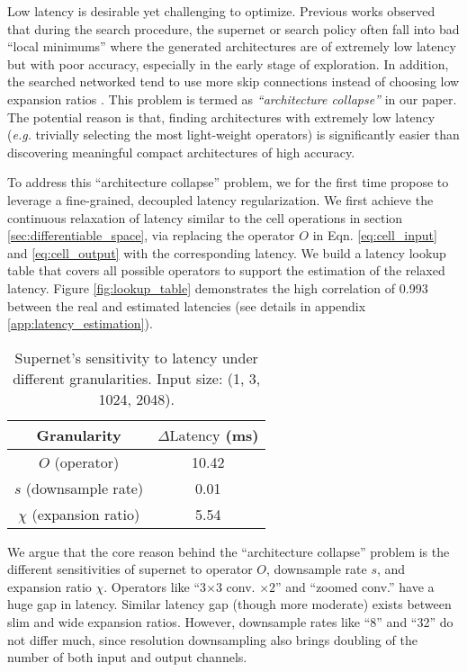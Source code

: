 \documentclass{article} \usepackage{iclr2020_conference,times}
\begin{document}
Low latency is desirable yet challenging to optimize. Previous works \citep{cheng2018instanas,zhang2019customizable} observed that during the search procedure, the supernet or search policy often fall into bad ``local minimums'' where the generated architectures are of extremely low latency but with poor accuracy, especially in the early stage of exploration. In addition, the searched networked tend to use more skip connections instead of choosing low expansion ratios \citep{shaw2019squeezenas}. This problem is termed as \textit{``architecture collapse''} in our paper. The potential reason is that, finding architectures with extremely low latency (\textit{e.g.} trivially selecting the most light-weight operators) is significantly easier than discovering meaningful compact architectures of high accuracy.

To address this ``architecture collapse'' problem, we for the first time propose to leverage a fine-grained, decoupled latency regularization. We first achieve the continuous relaxation of latency similar to the cell operations in section \ref{sec:differentiable_space}, via replacing the operator $O$ in Eqn. \ref{eq:cell_input} and \ref{eq:cell_output} with the corresponding latency. We build a latency lookup table that covers all possible operators to support the estimation of the relaxed latency. Figure \ref{fig:lookup_table} demonstrates the high correlation of 0.993 between the real and estimated latencies (see details in appendix \ref{app:latency_estimation}).

\begin{wraptable}{r}{56mm}
\vspace{-1.2em}
\footnotesize
\begin{center}
\caption{Supernet's sensitivity to latency under different granularities. Input size: (1, 3, 1024, 2048).}
\begin{tabular}{cc}\toprule
Granularity & $\Delta \mathrm{Latency}$ (ms) \\ \midrule
$O$ (operator) & 10.42 \\
$s$ (downsample rate) & 0.01 \\
$\chi$ (expansion ratio) & 5.54 \\ \bottomrule
\end{tabular}\label{table:arch_latency}
\end{center}\vspace{-1.2em}
\end{wraptable}

We argue that the core reason behind the ``architecture collapse'' problem is the different sensitivities of supernet to operator $O$, downsample rate $s$, and expansion ratio  $\chi$. Operators like ``3$\times$3 conv. $\times 2$'' and ``zoomed conv.'' have a huge gap in latency. Similar latency gap (though more moderate) exists between slim and wide expansion ratios. However, downsample rates like ``8'' and ``32'' do not differ much, since resolution downsampling also brings doubling of the number of both input and output channels.
\end{document}
